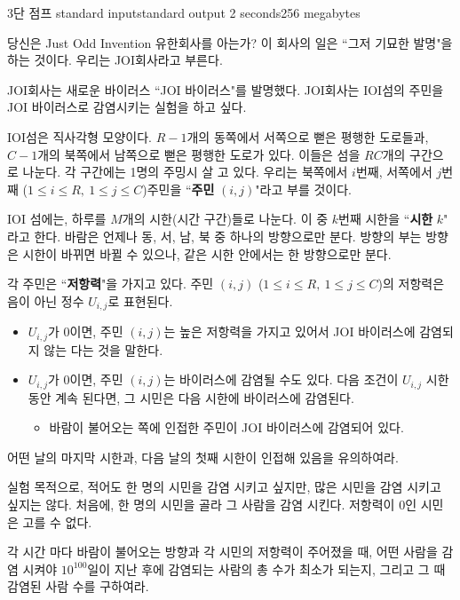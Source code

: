\begin{problem}{3단 점프}
	{standard input}{standard output}
	{2 seconds}{256 megabytes}{}
	
	당신은 Just Odd Invention 유한회사를 아는가? 이 회사의 일은 ``그저 기묘한 발명"을 하는 것이다. 우리는 JOI회사라고 부른다.
	
	JOI회사는 새로운 바이러스 ``JOI 바이러스"를 발명했다. JOI회사는 IOI섬의 주민을 JOI 바이러스로 감염시키는 실험을 하고 싶다.
	
	IOI섬은 직사각형 모양이다. $R-1$개의 동쪽에서 서쪽으로 뻗은 평행한 도로들과, $C-1$개의 북쪽에서 남쪽으로 뻗은 평행한 도로가 있다. 이들은 섬을 $RC$개의 구간으로 나눈다. 각 구간에는 1명의 주밍시 살 고 있다. 우리는 북쪽에서 $i$번째, 서쪽에서 $j$번째 ($1 \le i \le R, \ 1 \le j \le C$)주민을 ``\textbf{주민} $(i, j)$"라고 부를 것이다.
	
	IOI 섬에는, 하루를 $M$개의 시한(시간 구간)들로 나눈다. 이 중 $k$번째 시한을 ``\textbf{시한} $k$" 라고 한다. 바람은 언제나 동, 서, 남, 북 중 하나의 방향으로만 분다. 방향의 부는 방향은 시한이 바뀌면 바뀔 수 있으나, 같은 시한 안에서는 한 방향으로만 분다.
	
	각 주민은 ``\textbf{저항력}"을 가지고 있다. 주민 $(i, j)$ ($1 \le i \le R, \ 1 \le j \le C$)의 저항력은 음이 아닌 정수 $U_{i, j}$로 표현된다.
	
	
	\begin{itemize}
		\item $U_{i, j}$가 0이면, 주민 $(i, j)$는 높은 저항력을 가지고 있어서 JOI 바이러스에 감염되지 않는 다는 것을 말한다.
		\item $U_{i, j}$가 0이면, 주민 $(i, j)$는 바이러스에 감염될 수도 있다. 다음 조건이 $U_{i, j}$ 시한 동안 계속 된다면, 그 시민은 다음 시한에 바이러스에 감염된다.
		\begin{itemize}
			\item 바람이 불어오는 쪽에 인접한 주민이 JOI 바이러스에 감염되어 있다.
		\end{itemize}
	\end{itemize}

	어떤 날의 마지막 시한과, 다음 날의 첫째 시한이 인접해 있음을 유의하여라.
	
	실험 목적으로, 적어도 한 명의 시민을 감염 시키고 싶지만, 많은 시민을 감염 시키고 싶지는 않다. 처음에, 한 명의 시민을 골라 그 사람을 감염 시킨다. 저항력이 0인 시민은 고를 수 없다.
	
	각 시간 마다 바람이 불어오는 방향과 각 시민의 저항력이 주어졌을 때, 어떤 사람을 감염 시켜야 $10^100$일이 지난 후에 감염되는 사람의 총 수가 최소가 되는지, 그리고 그 때 감염된 사람 수를 구하여라.
	

\end{problem}
